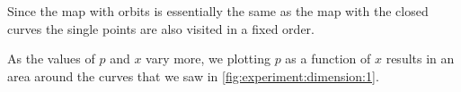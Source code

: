 	Since the map with orbits is essentially the same as the map with the closed curves the single points are also visited in a fixed order. 

	As the values of $p$ and $x$ vary more, we plotting $p$ as a function of $x$ results in an area around the curves that we saw in \cref{fig:experiment:dimension:1}.

